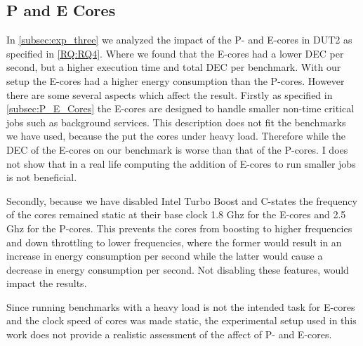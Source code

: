 \subsection{P and E Cores}
In \cref{subsec:exp_three} we analyzed the impact of the P- and E-cores in DUT2 as specified in \cref{RQ:RQ4}. Where we found that the E-cores had a lower DEC per second, but a higher execution time and total DEC per benchmark. With our setup the E-cores had a higher energy consumption than the P-cores. However there are some several aspects which affect the result. Firstly as specified in \cref{subsec:P_E_Cores} the E-cores are designed to handle smaller non-time critical jobs such as background services. This description does not fit the benchmarks we have used, because the put the cores under heavy load. Therefore while the DEC of the E-cores on our benchmark is worse than that of the P-cores. I does not show that in a real life computing the addition of E-cores to run smaller jobs is not beneficial.

Secondly, because we have disabled Intel Turbo Boost and C-states the frequency of the cores remained static at their base clock 1.8 Ghz for the E-cores and 2.5 Ghz for the P-cores. This prevents the cores from boosting to higher frequencies and down throttling to lower frequencies, where the former would result in an increase in energy consumption per second while the latter would cause a decrease in energy consumption per second. Not disabling these features, would  impact the results.

Since running benchmarks with a heavy load is not the intended task for E-cores and the clock speed of cores was made static, the experimental setup used in this work does not provide a realistic assessment of the affect of P- and E-cores.



